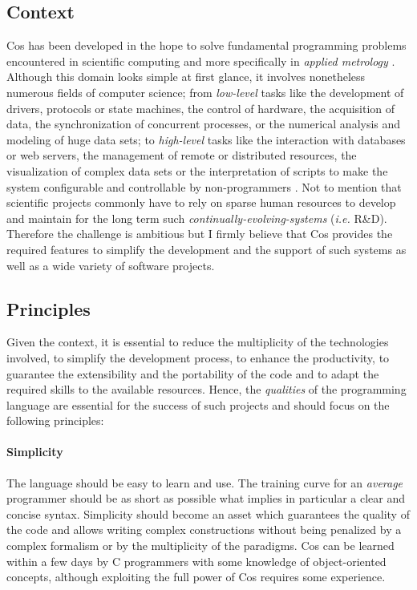 \documentclass[preprint,10pt]{sigplanconf}
\newcommand{\abbrev}[1]{{\em #1}\xspace}
\newcommand{\ie}{\abbrev{i.e.}}
\newcommand{\ProgLang}[1]{{\sc #1}\xspace}
\newcommand{\Cos}       {\ProgLang{Cos}}
\begin{document}
\subsection{Context}

\Cos has been developed in the hope to solve fundamental programming problems encountered in scientific computing and more specifically in {\em applied metrology} \cite{bos99, bos00}. Although this domain looks simple at first glance, it involves nonetheless numerous fields of computer science; from {\em low-level} tasks like the development of drivers, protocols or state machines, the control of hardware, the acquisition of data, the synchronization of concurrent processes, or the numerical analysis and modeling of huge data sets; to {\em high-level} tasks like the interaction with databases or web servers, the management of remote or distributed resources, the visualization of complex data sets or the interpretation of scripts to make the system configurable and controllable by non-programmers \cite{ems01, ems06, gio07}. Not to mention that scientific projects commonly have to rely on sparse human resources to develop and maintain for the long term such {\em continually-evolving-systems} (\ie R\&D). Therefore the challenge is ambitious but I firmly believe that \Cos provides the required features to simplify the development and the support of such systems as well as a wide variety of software projects.

\subsection{Principles}

Given the context, it is essential to reduce the multiplicity of the technologies involved, to simplify the development process, to enhance the productivity, to guarantee the extensibility and the portability of the code and to adapt the required skills to the available resources. Hence, the {\em qualities} of the programming language are essential for the success of such projects and should focus on the following principles:

\paragraph{Simplicity}

The language should be easy to learn and use. The training curve for an {\em average} programmer should be as short as possible what implies in particular a clear and concise syntax. Simplicity should become an asset which guarantees the quality of the code and allows writing complex constructions without being penalized by a complex formalism or by the multiplicity of the paradigms. \Cos can be learned within a few days by C programmers with some knowledge of object-oriented concepts, although exploiting the full power of \Cos requires some experience.
\end{document}
